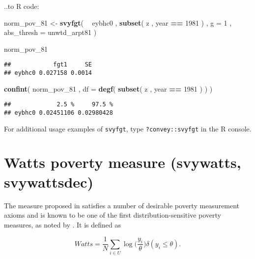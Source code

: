 \documentclass[]{book}
\newenvironment{Shaded}{\begin{snugshade}}{\end{snugshade}}
\newcommand{\DataTypeTok}[1]{\textcolor[rgb]{0.13,0.29,0.53}{#1}}
\newcommand{\DecValTok}[1]{\textcolor[rgb]{0.00,0.00,0.81}{#1}}
\newcommand{\KeywordTok}[1]{\textcolor[rgb]{0.13,0.29,0.53}{\textbf{#1}}}
\newcommand{\NormalTok}[1]{#1}
\newcommand{\OperatorTok}[1]{\textcolor[rgb]{0.81,0.36,0.00}{\textbf{#1}}}
\newcommand{\StringTok}[1]{\textcolor[rgb]{0.31,0.60,0.02}{#1}}
\begin{document}
..to R code:

\begin{Shaded}
\begin{Highlighting}[]
\NormalTok{norm_pov_}\DecValTok{81}\NormalTok{ <-}\StringTok{ }
\StringTok{    }\KeywordTok{svyfgt}\NormalTok{( }
        \OperatorTok{~}\StringTok{ }\NormalTok{eybhc0 , }
        \KeywordTok{subset}\NormalTok{( z , year }\OperatorTok{==}\StringTok{ }\DecValTok{1981}\NormalTok{ ) , }
        \DataTypeTok{g =} \DecValTok{1}\NormalTok{ , }
        \DataTypeTok{abs_thresh =}\NormalTok{ unwtd_arpt81}
\NormalTok{    )}
    
\NormalTok{norm_pov_}\DecValTok{81}
\end{Highlighting}
\end{Shaded}

\begin{verbatim}
##            fgt1     SE
## eybhc0 0.027158 0.0014
\end{verbatim}

\begin{Shaded}
\begin{Highlighting}[]
\KeywordTok{confint}\NormalTok{( norm_pov_}\DecValTok{81}\NormalTok{ , }\DataTypeTok{df =} \KeywordTok{degf}\NormalTok{( }\KeywordTok{subset}\NormalTok{( z , year }\OperatorTok{==}\StringTok{ }\DecValTok{1981}\NormalTok{ ) ) )}
\end{Highlighting}
\end{Shaded}

\begin{verbatim}
##             2.5 %     97.5 %
## eybhc0 0.02451106 0.02980428
\end{verbatim}

For additional usage examples of \texttt{svyfgt}, type \texttt{?convey::svyfgt} in the R console.

\hypertarget{watts-poverty-measure-svywatts-svywattsdec}{%
\section{Watts poverty measure (svywatts, svywattsdec)}\label{watts-poverty-measure-svywatts-svywattsdec}}

The measure proposed in \citet{watts1968} satisfies a number of desirable poverty measurement axioms and is known to be one of the first distribution-sensitive poverty measures, as noted by \citet{haughton2009}. It is defined as

\[
Watts = \frac{1}{N} \sum_{i \in U} \log{ \bigg( \frac{y_i}{\theta} \bigg) \delta ( y_i \leqslant \theta) }.
\]
\end{document}
